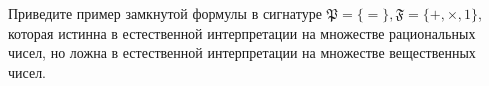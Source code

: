 Приведите пример замкнутой формулы в сигнатуре $\mathfrak{P} = \{=\}, \mathfrak{F} = \{+, \times, 1\}$, которая истинна в
естественной интерпретации на множестве рациональных чисел, но ложна в естественной интерпретации на множестве вещественных
чисел.